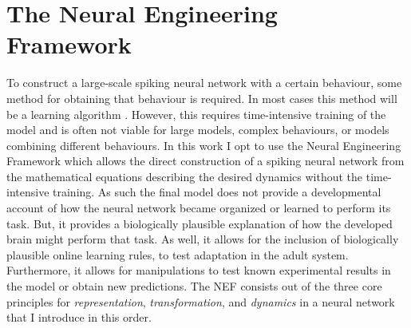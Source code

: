 \chapter{The Neural Engineering Framework}\label{sec:nef}

To construct a large-scale spiking neural network with a certain behaviour, some method for obtaining that behaviour is required.
In most cases this method will be a learning algorithm \parencite[e.g.,][]{oreilly2006}.
However, this requires time-intensive training of the model and is often not viable for large models, complex behaviours, or models combining different behaviours.
In this work I opt to use the Neural Engineering Framework \parencite[NEF;][]{eliasmith2003} which allows the direct construction of a spiking neural network from the mathematical equations describing the desired dynamics without the time-intensive training.
As such the final model does not provide a developmental account of how the neural network became organized or learned to perform its task.
But, it provides a biologically plausible explanation of how the developed brain might perform that task.
As well, it allows for the inclusion of biologically plausible online learning rules, to test adaptation in the adult system.
Furthermore, it allows for manipulations to test known experimental results in the model or obtain new predictions.
The NEF consists out of the three core principles for \emph{representation}, \emph{transformation}, and \emph{dynamics} in a neural network that I introduce in this order.

